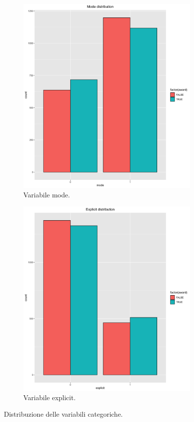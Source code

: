 \begin{figure}[!h]
	\begin{subfigure}[b]{0.3\textwidth}
		\centering
		\hspace*{-2cm}   
		\includegraphics[width=10cm]{../images/mode_distribution.png}
		\caption{Variabile mode.}
	\end{subfigure}
	\hfill
	\begin{subfigure}[b]{0.58\textwidth}
		\centering
		\includegraphics[width=10cm]{../images/explicit_distribution.png}
		\caption{Variabile explicit.}
	\end{subfigure}%
	\caption{Distribuzione delle variabili categoriche.}
\end{figure}

